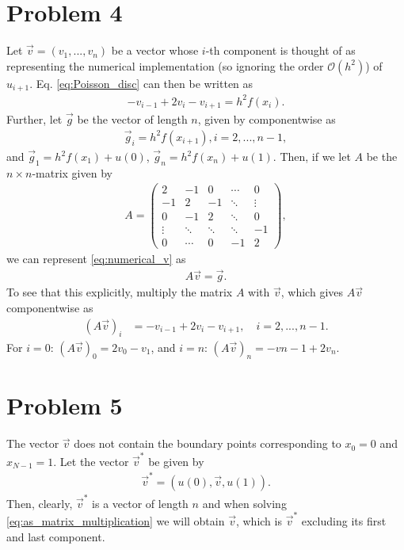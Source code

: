 \documentclass[english,notitlepage,reprint,nofootinbib]{revtex4-2}  %
\begin{document}
\section{Problem 4}
Let $\vec{v} = (v_1,...,v_{n})$ be a vector whose $i$-th component is thought of as representing the numerical implementation (so ignoring the order $\mathcal{O}(h^2)$) of $u_{i+1}$.
Eq. \eqref{eq:Poisson_disc} can then be written as 
\begin{align}
    -v_{i-1} + 2v_{i} - v_{i+1} = h^2f(x_i).    \label{eq:numerical_v}
\end{align}
Further, 
let $\vec{g}$ be the vector of length \(n\), given by componentwise as 
\begin{align}
    \vec{g}_{i} = h^2f(x_{i+1}), i = 2, ..., n-1, 
\end{align}
and \(\vec{g}_{1} = h^2f(x_{1}) + u(0)\), \(\vec{g}_{n} = h^2f(x_{n}) + u(1)\). Then, if we let $A$ be the \(n\times n\)-matrix given by
\begin{align}
    A = \begin{pmatrix}
        2 & -1 & 0 & \cdots & 0 \\
        -1 & 2 & -1 & \ddots & \vdots \\
        0 & -1 & 2 & \ddots & 0 \\
        \vdots & \ddots & \ddots & \ddots & -1 \\
        0 & \cdots & 0 & -1 & 2
    \end{pmatrix},
\end{align}
we can represent \eqref{eq:numerical_v} as 
\begin{align}
    A\vec{v} = \vec{g}. \label{eq:as_matrix_multiplication}
\end{align}
To see that this explicitly, multiply the matrix $A$ with $\vec{v}$, which gives $A\vec{v}$ componentwise as
\begin{align}
    (A\vec{v})_{i} &= -v_{i-1} + 2v_{i} - v_{i+1}, \quad i = 2, ..., n-1.
\end{align}
For \(i=0\): \((A\vec{v})_{0} = 2v_{0} - v_{1}\), and \(i=n\): \((A\vec{v})_{n} = -v{n-1} + 2v_{n}\).



\section{Problem 5}
The vector $\vec{v}$ does not contain the boundary points corresponding to $x_{0}=0$ and $x_{N-1}=1$. Let the vector $\vec{v}^*$ be given by 
\begin{align}
    \vec{v}^* = (u(0), \vec{v}, u(1)).
\end{align}
Then, clearly, \(\vec{v}^*\) is a vector of length $n$ and when solving \eqref{eq:as_matrix_multiplication} we will obtain $\vec{v}$, which is \(\vec{v}^*\) excluding its first and last component.
\end{document}
